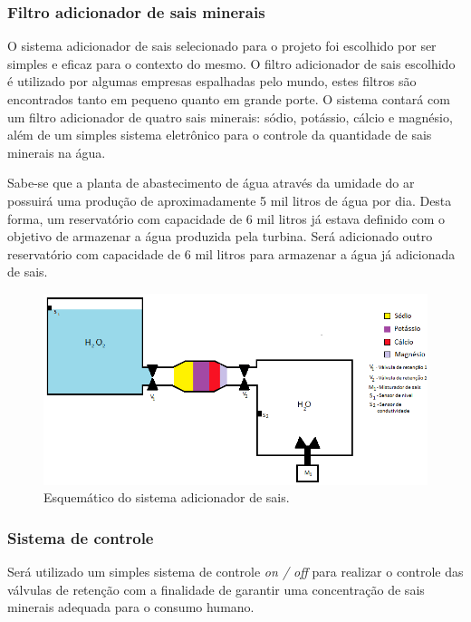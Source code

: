 \subsubsection{Filtro adicionador de sais minerais}

  O sistema adicionador de sais selecionado para o projeto foi escolhido por ser simples e eficaz para o contexto do mesmo. 
  O filtro adicionador de sais escolhido é utilizado por algumas empresas espalhadas pelo mundo, estes filtros são encontrados 
  tanto em pequeno quanto em grande porte. O sistema contará com um filtro adicionador de quatro sais minerais: sódio, potássio,
  cálcio e magnésio, além de um simples sistema eletrônico para o controle da quantidade de sais minerais na água. 
  
  Sabe-se que a planta de abastecimento de água através da umidade do ar possuirá uma produção de aproximadamente 5 mil litros
  de água por dia. Desta forma, um reservatório com capacidade de 6 mil litros já estava definido com o objetivo de armazenar 
  a água produzida pela turbina. Será adicionado outro reservatório com capacidade de 6 mil litros para armazenar a água já 
  adicionada de sais.
  
  \begin{figure}[!htbp]
    \centering
    \includegraphics[scale=0.6]{editaveis/figuras/sistema_adicionador_sais}
    \caption[Esquemático do sistema adicionador de sais]{Esquemático do sistema adicionador de sais.}
    \label{sistema_adicionador_sais}
  \end{figure}
  \FloatBarrier
  
\subsubsection{Sistema de controle}

  Será utilizado um simples sistema de controle \textit{on / off} para realizar o controle das válvulas de retenção com a finalidade de 
  garantir uma concentração de sais minerais adequada para o consumo humano. 
  
